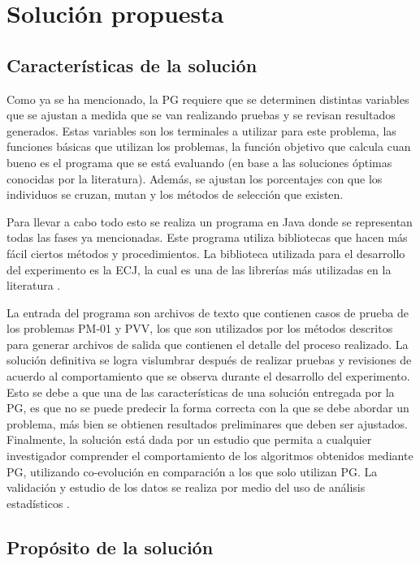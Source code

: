 \section{Solución propuesta}
\label{intro:solucion}


\subsection{Características de la solución}

Como ya se ha mencionado, la PG requiere que se determinen distintas variables que se ajustan a medida que se van realizando pruebas y se revisan resultados generados. Estas variables son los terminales a utilizar para este problema, las funciones básicas que utilizan los problemas, la función objetivo que calcula cuan bueno es el programa que se está evaluando (en base a las soluciones óptimas conocidas por la literatura). Además, se ajustan los porcentajes con que los individuos se cruzan, mutan y los métodos de selección que existen.

Para llevar a cabo todo esto se realiza un programa en Java donde se representan todas las fases ya mencionadas. Este programa utiliza bibliotecas que hacen más fácil ciertos métodos y procedimientos. La biblioteca utilizada para el desarrollo del experimento es la ECJ, la cual es una de las librerías más utilizadas en la literatura \citep{arcuri_2014}.

La entrada del programa son archivos de texto que contienen casos de prueba de los problemas PM-01 y PVV, los que son utilizados por los métodos descritos para generar archivos de salida que contienen el detalle del proceso realizado.
La solución definitiva se logra vislumbrar después de realizar pruebas y revisiones de acuerdo al comportamiento que se observa durante el desarrollo del experimento. Esto se debe a que una de las características de una solución entregada por la PG, es que no se puede predecir la forma correcta con la que se debe abordar un problema, más bien se obtienen resultados preliminares que deben ser ajustados. Finalmente, la solución está dada por un estudio que permita a cualquier investigador comprender el comportamiento de los algoritmos obtenidos mediante PG, utilizando co-evolución en comparación a los que solo utilizan PG. La validación y estudio de los datos se realiza por medio del uso de análisis estadísticos \citep{derrac_2011}.


\subsection{Propósito de la solución}

